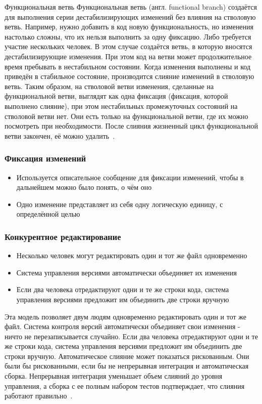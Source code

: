 \documentclass{../industrial-development}
\begin{document}
Функциональная ветвь
Функциональная ветвь (англ. functional branch) создаётся для выполнения серии дестабилизирующих изменений без влияния на стволовую ветвь. Например, нужно добавить в код новую функциональность, но изменения настолько сложны, что их нельзя выполнить за одну фиксацию. Либо требуется участие нескольких человек. В этом случае создаётся ветвь, в которую вносятся дестабилизирующие изменения. При этом код на ветви может продолжительное время пребывать в нестабильном состоянии. Когда изменения выполнены и код приведён в стабильное состояние, производится слияние изменений в стволовую ветвь. Таким образом, на стволовой ветви изменения, сделанные на функциональной ветви, выглядят как одна фиксация (фиксация, которой выполнено слияние), при этом нестабильных промежуточных состояний на стволовой ветви нет. Они есть только на функциональной ветви, где их можно посмотреть при необходимости. После слияния жизненный цикл функциональной ветви закончен, её можно удалить~\cite{Branching}.

\begin{frame} \frametitle{Фиксация изменений}
  \begin{itemize}
  \item Используется описательное сообщение для фиксации изменений, чтобы в дальнейшем можно было понять, о чём оно
  \item Одно изменение представляет из себя одну логическую единицу, с определённой целью
  \end{itemize}
\end{frame}

\begin{frame} \frametitle{Конкурентное редактирование}
  \begin{itemize}
  \item Несколько человек могут редактировать один и тот же файл одновременно
  \item Система управления версиями автоматически объединяет их изменения
  \item Если два человека отредактируют одни и те же строки кода, система управления версиями предложит им объединить две строки вручную
  \end{itemize}
\end{frame}

\lecturenotes

Эта модель позволяет двум людям одновременно редактировать один и тот же файл. Система контроля версий автоматически объединяет свои изменения - ничто не перезаписывается случайно. Если два человека отредактируют одни и те же строки кода, система управления версиями предложит им объединить две строки вручную. Автоматическое слияние может показаться рискованным. Они были бы рискованными, если бы не непрерывная интеграция и автоматическая сборка. Непрерывная интеграция уменьшает объем слияний до уровня управления, а сборка с ее полным набором тестов подтверждает, что слияния работают правильно~\cite[170-171]{AgileDevelopment}.
\end{document}

